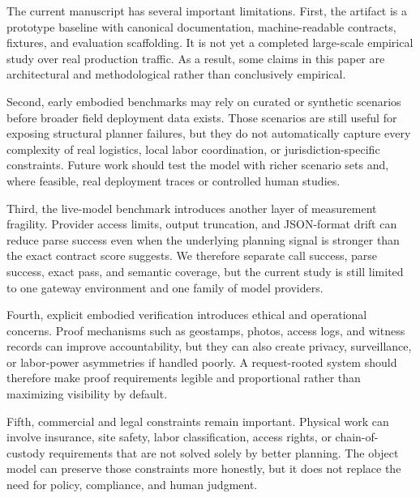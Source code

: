 The current manuscript has several important limitations. First, the artifact is a prototype baseline with canonical documentation, machine-readable contracts, fixtures, and evaluation scaffolding. It is not yet a completed large-scale empirical study over real production traffic. As a result, some claims in this paper are architectural and methodological rather than conclusively empirical.

Second, early embodied benchmarks may rely on curated or synthetic scenarios before broader field deployment data exists. Those scenarios are still useful for exposing structural planner failures, but they do not automatically capture every complexity of real logistics, local labor coordination, or jurisdiction-specific constraints. Future work should test the model with richer scenario sets and, where feasible, real deployment traces or controlled human studies.

Third, the live-model benchmark introduces another layer of measurement fragility. Provider access limits, output truncation, and JSON-format drift can reduce parse success even when the underlying planning signal is stronger than the exact contract score suggests. We therefore separate call success, parse success, exact pass, and semantic coverage, but the current study is still limited to one gateway environment and one family of model providers.

Fourth, explicit embodied verification introduces ethical and operational concerns. Proof mechanisms such as geostamps, photos, access logs, and witness records can improve accountability, but they can also create privacy, surveillance, or labor-power asymmetries if handled poorly. A request-rooted system should therefore make proof requirements legible and proportional rather than maximizing visibility by default.

Fifth, commercial and legal constraints remain important. Physical work can involve insurance, site safety, labor classification, access rights, or chain-of-custody requirements that are not solved solely by better planning. The object model can preserve those constraints more honestly, but it does not replace the need for policy, compliance, and human judgment.
